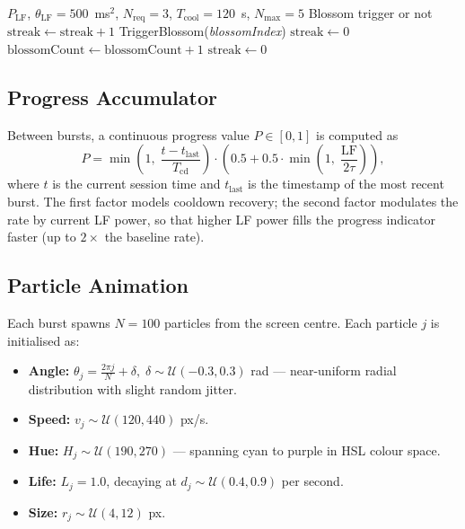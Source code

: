 \documentclass[11pt,a4paper]{article}
\begin{document}
\begin{algorithm}[htbp]
\caption{Flower Blossom Decision Logic (per analysis cycle, $\sim$1~Hz)}
\label{alg:flower-blossom}
\begin{algorithmic}[1]
\Require $P_{\text{LF}}$, $\theta_{\text{LF}} = 500$~ms$^2$, $N_{\text{req}} = 3$, $T_{\text{cool}} = 120$~s, $N_{\max} = 5$
\Ensure Blossom trigger or not
  \State \Return
\EndIf
{}
  \State \Return
\EndIf
{}
  \State $\text{streak} \leftarrow \text{streak} + 1$
    \State TriggerBlossom(\textit{blossomIndex})
    \State $\text{streak} \leftarrow 0$
    \State $\text{blossomCount} \leftarrow \text{blossomCount} + 1$
  \EndIf
\Else
  \State $\text{streak} \leftarrow 0$
\EndIf
\end{algorithmic}
\end{algorithm}

\subsection{Progress Accumulator}

Between bursts, a continuous progress value $P \in [0,1]$ is computed as
\[
P = \min\!\left(1,\; \frac{t - t_{\text{last}}}{T_{\text{cd}}}\right)
      \cdot \left(0.5 + 0.5 \cdot \min\!\left(1,\; \frac{\text{LF}}{2\tau}\right)\right),
\]
where $t$ is the current session time and $t_{\text{last}}$ is the timestamp
of the most recent burst. The first factor models cooldown recovery; the second
factor modulates the rate by current LF power, so that higher LF power fills
the progress indicator faster (up to $2\times$ the baseline rate).

\subsection{Particle Animation}

Each burst spawns $N = 100$ particles from the screen centre. Each particle
$j$ is initialised as:

\begin{itemize}
  \item \textbf{Angle:} $\theta_j = \frac{2\pi j}{N} + \delta,\;
    \delta \sim \mathcal{U}(-0.3, 0.3)$ rad — near-uniform radial distribution
    with slight random jitter.
  \item \textbf{Speed:} $v_j \sim \mathcal{U}(120, 440)$ px/s.
  \item \textbf{Hue:} $H_j \sim \mathcal{U}(190, 270)$ — spanning cyan to
    purple in HSL colour space.
  \item \textbf{Life:} $L_j = 1.0$, decaying at
    $d_j \sim \mathcal{U}(0.4, 0.9)$ per second.
  \item \textbf{Size:} $r_j \sim \mathcal{U}(4, 12)$ px.
\end{itemize}
\end{document}
